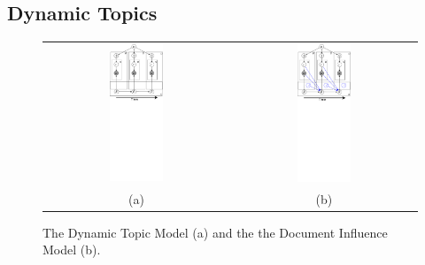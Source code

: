 \subsection*{Dynamic Topics}
\begin{figure}
  \centering
  \begin{tabular}{cc}
    \includegraphics[width=0.3\textwidth,bb=50 500 350 800]{chapter_influence/figures/dtm_gm.pdf} &
    \includegraphics[width=0.3\textwidth,bb=-50 500 250 800]{chapter_influence/figures/docinf_gm.pdf} \\
    (a) & (b) \\
  \end{tabular}
 \label{fig:doc_influence_model}
  \caption{\label{fig:gm} The Dynamic Topic Model (a) and the the Document Influence Model (b).}
\end{figure}

